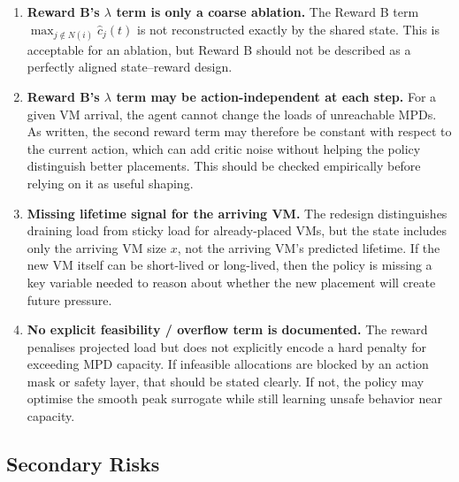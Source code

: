 \documentclass[11pt]{article}
\begin{document}
\begin{enumerate}
    \item \textbf{Reward B's $\lambda$ term is only a coarse ablation.}
    The Reward B term
    $\max_{j \notin N(i)} \hat{c}_j(t)$ is not reconstructed exactly by
    the shared state.  This is acceptable for an ablation, but Reward B
    should not be described as a perfectly aligned state--reward design.

    \item \textbf{Reward B's $\lambda$ term may be action-independent at each step.}
    For a given VM arrival, the agent cannot change the loads of
    unreachable MPDs.  As written, the second reward term may therefore
    be constant with respect to the current action, which can add critic
    noise without helping the policy distinguish better placements.
    This should be checked empirically before relying on it as useful
    shaping.

    \item \textbf{Missing lifetime signal for the arriving VM.}
    The redesign distinguishes draining load from sticky load for
    already-placed VMs, but the state includes only the arriving VM size
    $x$, not the arriving VM's predicted lifetime.  If the new VM itself
    can be short-lived or long-lived, then the policy is missing a key
    variable needed to reason about whether the new placement will
    create future pressure.

    \item \textbf{No explicit feasibility / overflow term is documented.}
    The reward penalises projected load but does not explicitly encode a
    hard penalty for exceeding MPD capacity.  If infeasible allocations
    are blocked by an action mask or safety layer, that should be stated
    clearly.  If not, the policy may optimise the smooth peak surrogate
    while still learning unsafe behavior near capacity.
\end{enumerate}

\subsection{Secondary Risks}
\end{document}
